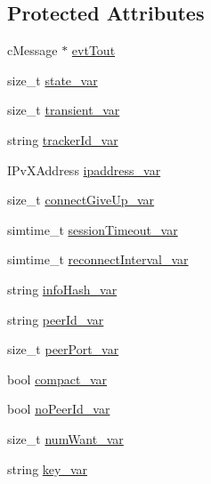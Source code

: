 \subsection*{Protected Attributes}
\begin{DoxyCompactItemize}
\item 
c\+Message $\ast$ \hyperlink{classBTTrackerClientBase_a728682a65c38c4152152bc5a64a768cf}{evt\+Tout}
\item 
size\+\_\+t \hyperlink{classBTTrackerClientBase_a0eead109fc2d0e3cd0462b1e19f87545}{state\+\_\+var}
\item 
size\+\_\+t \hyperlink{classBTTrackerClientBase_a1d356eceda84b31bef362f262c664a71}{transient\+\_\+var}
\item 
string \hyperlink{classBTTrackerClientBase_aee1b8d7f800c7642c1bdc435e968ec3b}{tracker\+Id\+\_\+var}
\item 
I\+Pv\+X\+Address \hyperlink{classBTTrackerClientBase_a17ed36fc72a43ca1e95020de9acc5e77}{ipaddress\+\_\+var}
\item 
size\+\_\+t \hyperlink{classBTTrackerClientBase_a7cad897127fe659fd57a3bf41a3645e0}{connect\+Give\+Up\+\_\+var}
\item 
simtime\+\_\+t \hyperlink{classBTTrackerClientBase_ab3b0b46284315a9b2e71daf379b7a3ff}{session\+Timeout\+\_\+var}
\item 
simtime\+\_\+t \hyperlink{classBTTrackerClientBase_a4fb36f2c092a853cc4611b1faa51b802}{reconnect\+Interval\+\_\+var}
\item 
string \hyperlink{classBTTrackerClientBase_ade240dc1b9440fa2d6a8ba23ed8db3ae}{info\+Hash\+\_\+var}
\item 
string \hyperlink{classBTTrackerClientBase_aa9be905707abb2eb69f831ffcd9a67e8}{peer\+Id\+\_\+var}
\item 
size\+\_\+t \hyperlink{classBTTrackerClientBase_a729473eedff089d0ae0be578cc1af653}{peer\+Port\+\_\+var}
\item 
bool \hyperlink{classBTTrackerClientBase_a8a7ea410b57b218ab38ee9394951557f}{compact\+\_\+var}
\item 
bool \hyperlink{classBTTrackerClientBase_ab23d101af767f0979c9de612fb2d511e}{no\+Peer\+Id\+\_\+var}
\item 
size\+\_\+t \hyperlink{classBTTrackerClientBase_a8e15dea1f9c602da6e78d85e271092e6}{num\+Want\+\_\+var}
\item 
string \hyperlink{classBTTrackerClientBase_a7ce835ff5b9d4e65905e6ef3635ad827}{key\+\_\+var}
\end{DoxyCompactItemize}



